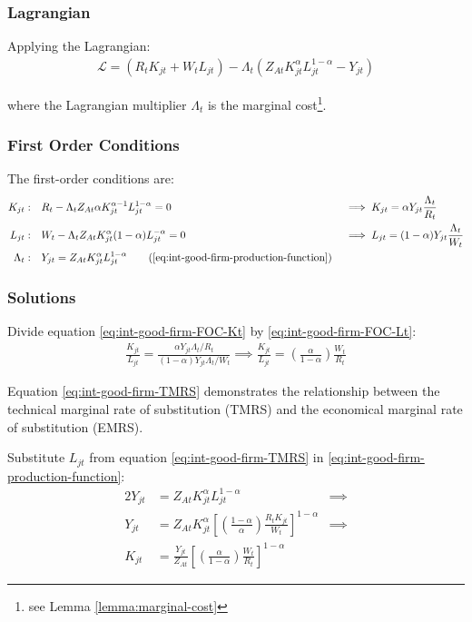\documentclass[
	12pt, 
	]{article}
\numberwithin{equation}{section}
\theoremstyle{definition}
\theoremstyle{plain}
\theoremstyle{plain}
\theoremstyle{plain}
\begin{document}
\subsubsection*{Lagrangian}

Applying the Lagrangian:
\begin{align}
\label{eq:int-good-firm-lagrangian}
	\mathcal{L} = (R_t K_{jt} + W_t L_{jt}) - \Lambda_t (Z_{At} K_{jt}^\alpha L_{jt}^{1-\alpha} - Y_{jt})
\end{align}

where the Lagrangian multiplier $\Lambda_t$ is the marginal cost\footnote{see Lemma \ref{lemma:marginal-cost}}.

\subsubsection*{First Order Conditions}

The first-order conditions are:
\begin{alignat}{2}
	K_{jt}: \quad & R_t - \Lambda_t Z_{At} \alpha K_{jt}^{\alpha-1} L_{jt}^{1-\alpha} = 0 &&\implies K_{jt} = \alpha Y_{jt} \frac{\Lambda_t}{R_t} \label{eq:int-good-firm-FOC-Kt} \\
	L_{jt}: \quad & W_t - \Lambda_t Z_{At} K_{jt}^\alpha (1-\alpha) L_{jt}^{-\alpha} = 0 \quad &&\implies L_{jt} = (1-\alpha) Y_{jt} \frac{\Lambda_t}{W_t} \label{eq:int-good-firm-FOC-Lt} \\
	\Lambda_t: \quad & Y_{jt} = Z_{At} K_{jt}^\alpha L_{jt}^{1-\alpha} \tag{\ref{eq:int-good-firm-production-function}}
\end{alignat}

\subsubsection*{Solutions}

Divide equation \ref{eq:int-good-firm-FOC-Kt} by \ref{eq:int-good-firm-FOC-Lt}:
\begin{align}
	\frac{K_{jt}}{L_{jt}} = \frac{\alpha Y_{jt} \Lambda_t /R_t}{(1-\alpha) Y_{jt} \Lambda_t /W_t} \implies
	\frac{K_{jt}}{L_{jt}} = \left( \frac{\alpha}{1-\alpha} \right) \frac{W_t}{R_t} \label{eq:int-good-firm-TMRS}
\end{align}

Equation \ref{eq:int-good-firm-TMRS} demonstrates the relationship between the technical marginal rate of substitution (TMRS) and the economical marginal rate of substitution (EMRS). 

Substitute $L_{jt}$ from equation \ref{eq:int-good-firm-TMRS} in \ref{eq:int-good-firm-production-function}:
\begin{alignat}{2}
	Y_{jt} & = Z_{At} K_{jt}^\alpha L_{jt}^{1-\alpha} &\implies \nonumber \\
	Y_{jt} & = Z_{At} K_{jt}^\alpha \left[ \left( \frac{1-\alpha}{\alpha} \right) \frac{R_t K_{jt}}{W_t} \right]^{1-\alpha} &\implies \nonumber \\
	K_{jt} & = \frac{Y_{jt}}{Z_{At}} \left[ \left( \frac{\alpha}{1-\alpha} \right) \frac{W_t}{R_t}\right]^{1-\alpha} \label{eq:int-good-firm-Kt-demand}
\end{alignat}
\end{document}
